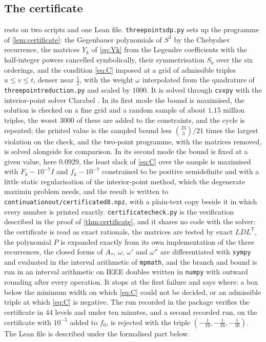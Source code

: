 \documentclass[11pt,reqno]{amsart}
\renewcommand{\_}{\origunderscore\allowbreak}
\numberwithin{equation}{section}
\theoremstyle{plain}
\theoremstyle{definition}
\theoremstyle{remark}
\begin{document}
\subsection*{The certificate}

 rests on two scripts and one Lean file.
\texttt{three\_point\_sdp.py} sets up the programme of
\cref{lem:certificate}: the Gegenbauer polynomials of $S^3$ by the
Chebyshev recurrence, the matrices $Y_k$ of \eqref{eq:Yk} from the
Legendre coefficients with the half-integer powers cancelled
symbolically, their symmetrisation $S_k$ over the six orderings, and
the condition \eqref{eq:C} imposed at a grid of admissible triples
$u\le v\le t$, denser near $\tfrac12$, with the weight $\omega$
interpolated from the quadrature of \texttt{three\_point\_reduction.py}
and scaled by $1000$. It is solved through \texttt{cvxpy} \cite{DB16}
with the interior-point solver Clarabel \cite{GC26}. In its first mode
the bound is maximised, the solution is checked on a fine grid and a
random sample of about $1.15$ million triples, the worst $3000$ of these
are added to the constraints, and the cycle is repeated; the printed
value is the sampled bound less $\binom{23}3/21$ times the largest
violation on the check, and the two-point programme, with the matrices
removed, is solved alongside for comparison. In its second mode the
bound is fixed at a given value, here $0.0929$, the least slack of
\eqref{eq:C} over the sample is maximised with $F_k-10^{-7}I$ and
$f_k-10^{-7}$ constrained to be positive semidefinite and with a
little static regularisation of the interior-point method, which the
degenerate maximin problem needs, and the result is written to
\texttt{continuation\_out/certificate\_d8.npz}, with a plain-text copy
beside it in which every number is printed exactly.
\texttt{certificate\_check.py} is the verification described in the
proof of \cref{thm:certificate}, and it shares no code with the
solver: the certificate is read as exact rationals, the matrices are
tested by exact $LDL^{\mathsf T}$, the polynomial $P$ is expanded
exactly from its own implementation of the three recurrences, the
closed forms of $A_*$, $\omega$, $\omega'$ and $\omega''$ are
differentiated with \texttt{sympy} and evaluated in the interval
arithmetic of \texttt{mpmath}, and the branch and bound is run in an
interval arithmetic on IEEE doubles written in \texttt{numpy} with
outward rounding after every operation. It stops at the first failure
and says where: a box below the minimum width on which \eqref{eq:C}
could not be decided, or an admissible triple at which \eqref{eq:C} is
negative. The run recorded in the package verifies the certificate in
$44$ levels and under ten minutes, and a second recorded run, on the
certificate with $10^{-5}$ added to $f_0$, is rejected with the triple
$(-\tfrac1{16},-\tfrac1{16},-\tfrac1{16})$. The Lean file is described
under the formalised part below.
\end{document}
